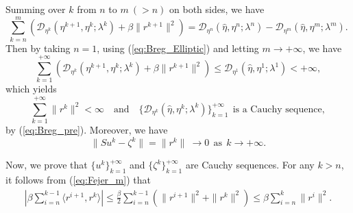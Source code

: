 \documentclass[leqno]{amsart}
\theoremstyle{definition}
\begin{document}
Summing over $k$ from $n$ to $m\ (> n)$ on both sides, we have
\begin{equation}\label{eq:Breg_pre}
\sum\limits_{k=n}^{m}\left( \mathcal{D}_{\eta^{k}}(\eta^{k+1},\eta^{k}; \lambda^{k}) + \beta\|r^{k+1}\|^2\right) = \mathcal{D}_{\eta^{n}}(\hat{\eta},\eta^{n}; \lambda^{n}) - \mathcal{D}_{\eta^{m}}(\hat{\eta},\eta^{m}; \lambda^{m}).
\end{equation}
Then by taking $n=1$, using (\ref{eq:Breg_Elliptic}) and letting $m\rightarrow +\infty$, we have
\begin{equation}\nonumber
\sum\limits_{k=1}^{+\infty}\left( \mathcal{D}_{\eta^{k}}(\eta^{k+1},\eta^{k}; \lambda^{k}) + \beta\|r^{k+1}\|^2\right) \leq \mathcal{D}_{\eta^{1}}(\hat{\eta},\eta^{1}; \lambda^{1})<+\infty,
\end{equation}
which yields
\begin{equation}\label{eq:r_c}
\sum\limits_{k=1}^{+\infty}\|r^{k}\|^2<\infty\quad \mbox{and}\quad \{\mathcal{D}_{\eta^{k}}(\hat{\eta},\eta^{k}; \lambda^{k})\}_{k=1}^{+\infty}\ \ \mbox{is\ a\ Cauchy\ sequence},
\end{equation}
by (\ref{eq:Breg_pre}).
Moreover, we have
\begin{equation}\label{eq:S_c}
\|Su^k - \zeta^k\| = \|r^k\|\ \rightarrow 0\ \ \mbox{as}\ \ k\rightarrow + \infty.
\end{equation}

Now, we prove that $\{u^k\}_{k=1}^{+\infty}$ and $\{\zeta^k\}_{k=1}^{+\infty}$ are Cauchy sequences.
For any $k>n$, it follows from  (\ref{eq:Fejer_m}) that
\begin{equation}\label{eq:rm_b}
\begin{aligned}
|\beta\sum\limits_{i = n}^{k-1}\langle r^{i+1}, r^k\rangle|
\leq \frac{\beta}{2}\sum\limits_{i = n}^{k-1}(\|r^{i+1}\|^2 +  \|r^k\|^2)
\leq \beta\sum\limits_{i = n}^{k}\|r^{i}\|^2.
\end{aligned}
\end{equation}
\end{document}
